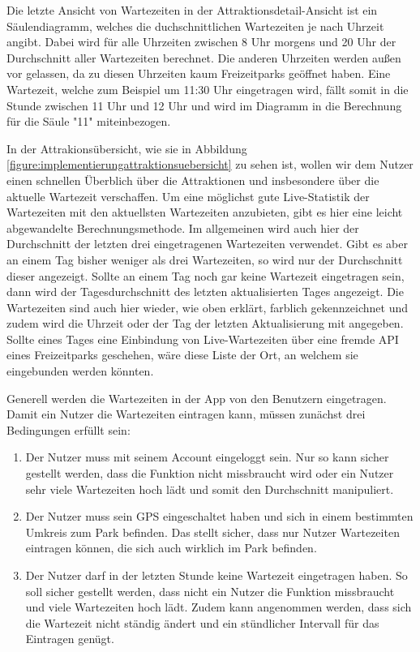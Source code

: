 Die letzte Ansicht von Wartezeiten in der Attraktionsdetail-Ansicht ist ein Säulendiagramm, welches die duchschnittlichen Wartezeiten je nach Uhrzeit angibt. Dabei wird für alle Uhrzeiten zwischen 8 Uhr morgens und 20 Uhr der Durchschnitt aller Wartezeiten berechnet. Die anderen Uhrzeiten werden außen vor gelassen, da zu diesen Uhrzeiten kaum Freizeitparks geöffnet haben. Eine Wartezeit, welche zum Beispiel um 11:30 Uhr eingetragen wird, fällt somit in die Stunde zwischen 11 Uhr und 12 Uhr und wird im Diagramm in die Berechnung für die Säule "11"{}  miteinbezogen.

In der Attrakionsübersicht, wie sie in Abbildung \ref{figure:implementierungattraktionsuebersicht} zu sehen ist, wollen wir dem Nutzer einen schnellen Überblich über die Attraktionen und insbesondere über die aktuelle Wartezeit verschaffen. Um eine möglichst gute Live-Statistik der Wartezeiten mit den aktuellsten Wartezeiten anzubieten, gibt es hier eine leicht abgewandelte Berechnungsmethode. Im allgemeinen wird auch hier der Durchschnitt der letzten drei eingetragenen Wartezeiten verwendet. Gibt es aber an einem Tag bisher weniger als drei Wartezeiten, so wird nur der Durchschnitt dieser angezeigt. Sollte an einem Tag noch gar keine Wartezeit eingetragen sein, dann wird der Tagesdurchschnitt des letzten aktualisierten Tages angezeigt. Die Wartezeiten sind auch hier wieder, wie oben erklärt, farblich gekennzeichnet und zudem wird die Uhrzeit oder der Tag der letzten Aktualisierung mit angegeben. Sollte eines Tages eine Einbindung von Live-Wartezeiten über eine fremde API eines Freizeitparks geschehen, wäre diese Liste der Ort, an welchem sie eingebunden werden könnten.

Generell werden die Wartezeiten in der App von den Benutzern eingetragen. Damit ein Nutzer die Wartezeiten eintragen kann, müssen zunächst drei Bedingungen erfüllt sein:
\begin{enumerate} 
\item Der Nutzer muss mit seinem Account eingeloggt sein. Nur so kann sicher gestellt werden, dass die Funktion nicht missbraucht wird oder ein Nutzer sehr viele Wartezeiten hoch lädt und somit den Durchschnitt manipuliert.
\item Der Nutzer muss sein GPS eingeschaltet haben und sich in einem bestimmten Umkreis zum Park befinden. Das stellt sicher, dass nur Nutzer Wartezeiten eintragen können, die sich auch wirklich im Park befinden.
\item Der Nutzer darf in der letzten Stunde keine Wartezeit eingetragen haben. So soll sicher gestellt werden, dass nicht ein Nutzer die Funktion missbraucht und viele Wartezeiten hoch lädt. Zudem kann angenommen werden, dass sich die Wartezeit nicht ständig ändert und ein stündlicher Intervall für das Eintragen genügt.
\end{enumerate}

